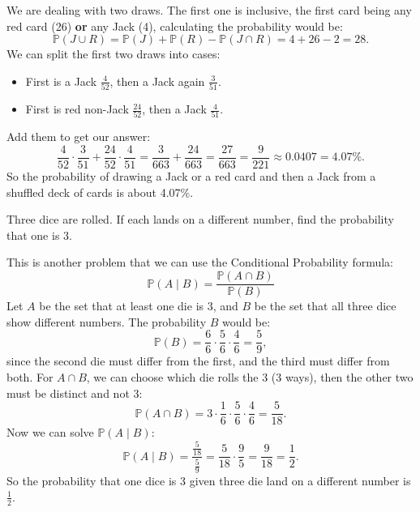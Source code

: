 \documentclass{jhwhw}
\begin{document}
    \solution
        We are dealing with two draws. The first one is inclusive, the first card being any red card (26) \textbf{or} any Jack (4),
        calculating the probability would be:
        \[
            \mathbb{P}(J \cup R) = \mathbb{P}(J)+\mathbb{P}(R)-\mathbb{P}(J \cap R) = 4 + 26 - 2 = 28.
        \]
        We can split the first two draws into cases:
        \begin{itemize}
            \item First is a Jack \(\frac{4}{52}\), then a Jack again \(\frac{3}{51}\).
            \item First is red non-Jack \(\frac{24}{52}\), then a Jack \(\frac{4}{51}\). 
        \end{itemize}
        Add them to get our answer:
        \[
            \frac{4}{52} \cdot \frac{3}{51} + \frac{24}{52} \cdot \frac{4}{51} = \frac{3}{663} + \frac{24}{663} = \frac{27}{663} = \frac{9}{221} \approx 0.0407 = 4.07\%.
        \]
        So the probability of drawing a Jack or a red card and then a Jack from a shuffled deck of cards is about 4.07\%.

    
    \problem{}
        Three dice are rolled. If each lands on a different number, find the probability that one is 3.
    
    \solution
        This is another problem that we can use the Conditional Probability formula:
        \[
            \mathbb{P}(A \mid B) = \frac{\mathbb{P}(A \cap B)}{\mathbb{P}(B)}
        \]
        Let \(A\)  be the set that at least one die is 3, and \(B\) be the set that all three dice show different numbers.
        The probability \(B\) would be:
        \[
            \mathbb{P}(B) = \frac{6}{6} \cdot \frac{5}{6} \cdot \frac{4}{6} = \frac{5}{9},
        \]
        since the second die must differ from the first, and the third must differ from both. For \(A \cap B\), we can
        choose which die rolls the 3 (3 ways), then the other two must be distinct and not 3:
        \[
            \mathbb{P}(A \cap B) = 3 \cdot \frac{1}{6} \cdot \frac{5}{6} \cdot \frac{4}{6} = \frac{5}{18}.
        \]
        Now we can solve \(\mathbb{P}(A \mid B)\): 
        \[
            \mathbb{P}(A \mid B) = \frac{\frac{5}{18}}{\frac{5}{9}} = \frac{5}{18} \cdot \frac{9}{5} = \frac{9}{18} = \frac{1}{2}.
        \]
        So the probability that one dice is 3 given three die land on a different number is \(\frac{1}{2}\). 
\end{document}
